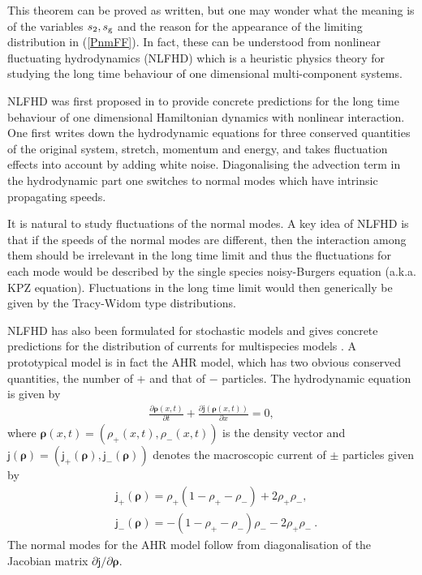\documentclass[cmp]{svjour}
\numberwithin{theorem}{section}
\numberwithin{equation}{section}
\begin{document}
This theorem can be proved as written, but one may wonder what the meaning is of the variables $s_2,s_{\rm g}$ and the reason for the appearance of the limiting distribution in (\ref{PnmFF}). In fact, these can be understood from nonlinear fluctuating hydrodynamics (NLFHD) which is a heuristic physics theory for studying the long time behaviour of one dimensional multi-component systems.

NLFHD was first proposed in \cite{van2012exact,spohn2014nonlinear} to provide concrete predictions for the long time behaviour of one dimensional Hamiltonian dynamics with nonlinear interaction. One first writes down the hydrodynamic equations for
three conserved quantities of the original system, stretch, momentum and energy, and takes fluctuation effects into account by adding white noise. Diagonalising the advection term in the hydrodynamic part one switches to normal modes which have intrinsic propagating speeds.

It is natural to study fluctuations of the normal modes. A key idea of NLFHD is that if the speeds of the normal modes are different, then the interaction among them should be irrelevant in the long time limit and thus the fluctuations for each mode would be described by the single species noisy-Burgers equation (a.k.a. KPZ equation). Fluctuations in the long time limit would then generically be given by the Tracy-Widom type distributions.

NLFHD has also been formulated for stochastic models and gives concrete predictions for the distribution of currents for multispecies models \cite{ferrari2013coupled}. A prototypical model is in fact the AHR model, which has two obvious conserved
quantities, the number of $+$ and that of $-$ particles. The hydrodynamic equation is given by
\begin{align}
	\frac{\partial \boldsymbol \rho(x,t) }{\partial t}+\frac{\partial\boldsymbol{\mathsf j}(\boldsymbol \rho(x,t))}{\partial x}=0,
\end{align}
where $\boldsymbol \rho(x,t) = (\rho_+(x,t),\rho_-(x,t))$ is the density vector and
$\boldsymbol{\mathsf j}(\boldsymbol \rho) = (\mathsf j_{+}(\boldsymbol \rho), \mathsf j_{-}(\boldsymbol \rho))$ denotes the macroscopic current of $\pm$ particles given by
\begin{align}
	&\mathsf j_{+} (\boldsymbol \rho)=\rho_+(1-\rho_+-\rho_-) + 2\rho_+\rho_-,\label{currenth}\\[2mm]
	&\mathsf j_{-} (\boldsymbol \rho)=-(1-\rho_+-\rho_-)\rho_- -2\rho_+\rho_- \ . \label{currentc}
\end{align}
The normal modes for the AHR model follow from diagonalisation of the Jacobian matrix $\partial \boldsymbol{\mathsf j}/ \partial \boldsymbol \rho$.
\end{document}
